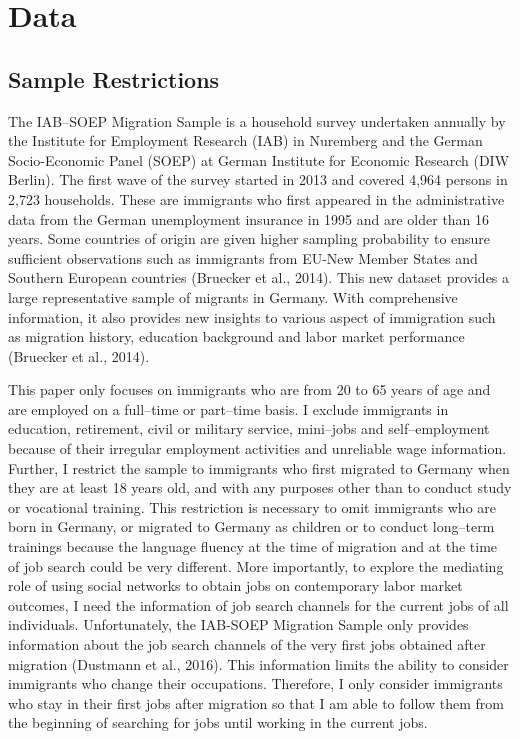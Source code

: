 \documentclass[12pt,a4paper]{article}
\begin{document}




\section{Data}
\subsection{Sample Restrictions}

The IAB--SOEP Migration Sample is a household survey undertaken annually by the Institute for Employment Research (IAB) in Nuremberg and the German Socio-Economic Panel (SOEP) at German Institute for Economic Research (DIW Berlin). The first wave of the survey started in 2013 and covered 4,964 persons in 2,723 households. These are immigrants who first appeared in the administrative data from the German unemployment insurance in 1995 and are older than 16 years. Some countries of origin are given higher sampling probability to ensure sufficient observations such as immigrants from EU-New Member States and Southern European countries (Bruecker et al., 2014). This new dataset provides a large representative sample of migrants in Germany. With comprehensive information, it also provides new insights to various aspect of immigration such as migration history, education background and labor market performance (Bruecker et al., 2014).

This paper only focuses on immigrants who are from 20 to 65 years of age and are employed on a full--time or part--time basis. I exclude immigrants in education, retirement, civil or military service, mini--jobs and self--employment because of their irregular employment activities and unreliable wage information. Further, I restrict the sample to immigrants who first migrated to Germany when they are at least 18 years old, and with any purposes other than to conduct study or vocational training. This restriction is necessary to omit immigrants who are born in Germany, or migrated to Germany as children or to conduct long--term trainings because the language fluency at the time of migration and at the time of job search could be very different. More importantly, to explore the mediating role of using social networks to obtain jobs on contemporary labor market outcomes, I need the information of job search channels for the current jobs of all individuals. Unfortunately, the IAB-SOEP Migration Sample only provides information about the job search channels of the very first jobs obtained after migration (Dustmann et al., 2016). This information limits the ability to consider immigrants who change their occupations. Therefore, I only consider immigrants who stay in their first jobs after migration so that I am able to follow them from the beginning of searching for jobs until working in the current jobs. 
\end{document}
